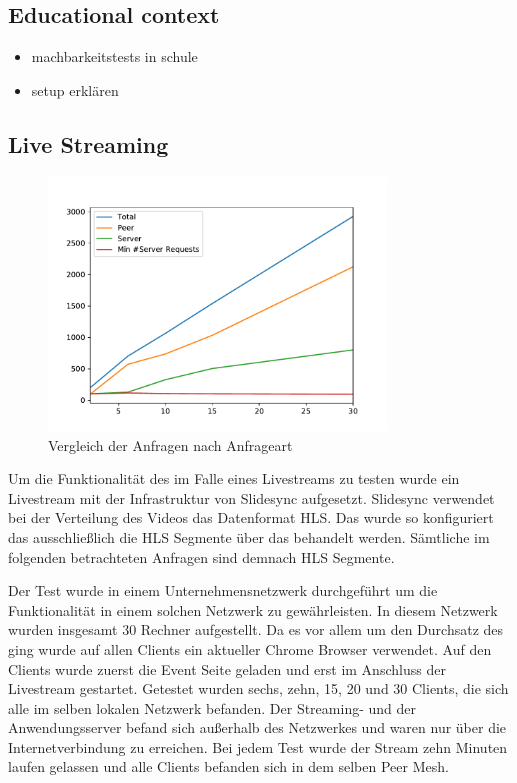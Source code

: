 \subsection{Educational context}
\begin{itemize}
	\item machbarkeitstests in schule
	\item setup erklären
	
\end{itemize}

\subsection{Live Streaming}
\begin{figure}[!h]
	\centering
	\includegraphics[width=0.8\textwidth]{figures/clients_line_chart}
	\caption[A Figure Short-Title]{Vergleich der Anfragen nach Anfrageart}
	\label{fig:live_stream_line_chart}
\end{figure}
Um die Funktionalität des \cdns im Falle eines Livestreams zu testen wurde ein Livestream mit der Infrastruktur von Slidesync aufgesetzt. Slidesync verwendet bei der Verteilung des Videos das Datenformat HLS. Das \cdn wurde so konfiguriert das ausschließlich die HLS Segmente über das \cdn behandelt werden. Sämtliche im folgenden betrachteten Anfragen sind demnach HLS Segmente. 

Der Test wurde in einem Unternehmensnetzwerk durchgeführt um die Funktionalität in einem solchen Netzwerk zu gewährleisten. In diesem Netzwerk wurden insgesamt 30 Rechner aufgestellt. Da es vor allem um den Durchsatz des \cdns ging wurde auf allen Clients ein aktueller Chrome Browser verwendet. Auf den Clients wurde zuerst die Event Seite geladen und erst im Anschluss der Livestream gestartet. Getestet wurden sechs, zehn, 15, 20 und 30 Clients, die sich alle im selben lokalen Netzwerk befanden. Der Streaming- und der Anwendungsserver befand sich außerhalb des Netzwerkes und waren nur über die Internetverbindung zu erreichen. Bei jedem Test wurde der Stream zehn Minuten laufen gelassen und alle Clients befanden sich in dem selben Peer Mesh.

